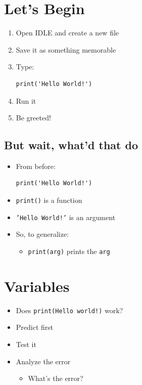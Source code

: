 \documentclass[11pt]{article}
\begin{document}
\section{Let's Begin}
\label{sec:org9ec2b37}
\begin{enumerate}
\item Open IDLE and create a new file
\item Save it as something memorable

\item Type:
\begin{verbatim}
print('Hello World!')
\end{verbatim}
\item Run it
\item Be greeted!
\end{enumerate}

\subsection{But wait, what'd that do}
\label{sec:orgcf3f763}
\begin{itemize}
\item From before:
\begin{verbatim}
print('Hello World!')
\end{verbatim}
\item \texttt{print()} is a function
\item \texttt{'Hello World!'} is an argument
\item So, to generalize:
\begin{itemize}
\item \texttt{print(arg)} prints the \texttt{arg}
\end{itemize}
\end{itemize}
\section{Variables}
\label{sec:orgfe19b2e}
\begin{itemize}
\item Does \texttt{print(Hello world!)} work?
\item Predict first
\item Test it
\item Analyze the error
\begin{itemize}
\item What's the error?
\end{itemize}
\end{itemize}
\end{document}
